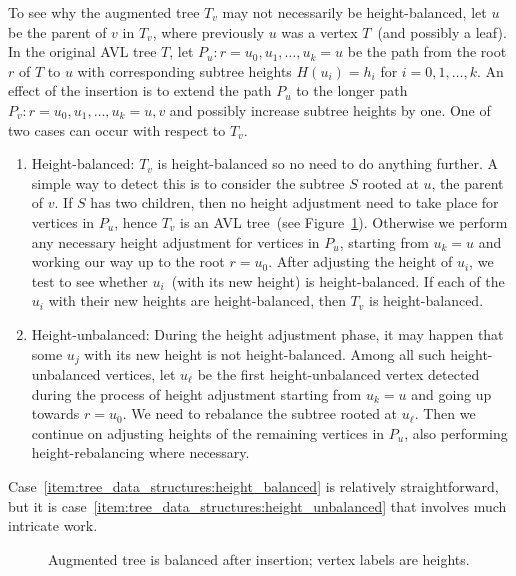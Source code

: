 To see why the augmented tree $T_v$ may not necessarily be
height-balanced, let $u$ be the parent of $v$ in $T_v$, where
previously $u$ was a vertex $T$~(and possibly a leaf). In the original
AVL tree $T$, let $P_u: r = u_0, u_1, \dots, u_k = u$ be the path from
the root $r$ of $T$ to $u$ with corresponding subtree heights $H(u_i)
= h_i$ for $i = 0, 1, \dots, k$. An effect of the insertion is to
extend the path $P_u$ to the longer path
$P_v: r = u_0, u_1, \dots, u_k = u, v$ and possibly increase subtree
heights by one. One of two cases can occur with respect to $T_v$.
\begin{enumerate}
\item\label{item:tree_data_structures:height_balanced}
  Height-balanced: $T_v$ is height-balanced so no need to do anything
  further. A simple way to detect this is to consider the subtree $S$
  rooted at $u$, the parent of $v$. If $S$ has two children, then no
  height adjustment need to take place for vertices in $P_u$, hence
  $T_v$ is an AVL tree~(see
  Figure~\ref{fig:tree_data_structures:augmented_tree_balanced_after_insertion}).
  Otherwise we perform any necessary height adjustment for vertices in
  $P_u$, starting from $u_k = u$ and working our way up to the root
  $r = u_0$. After adjusting the height of $u_i$, we test to see
  whether $u_i$~(with its new height) is height-balanced. If each of
  the $u_i$ with their new heights are height-balanced, then $T_v$ is
  height-balanced.

\item\label{item:tree_data_structures:height_unbalanced}
  Height-unbalanced: During the height adjustment phase, it may happen
  that some $u_j$ with its new height is not height-balanced. Among
  all such height-unbalanced vertices, let $u_\ell$ be the first
  height-unbalanced vertex detected during the process of height
  adjustment starting from $u_k = u$ and going up towards
  $r = u_0$. We need to rebalance the subtree rooted at $u_\ell$. Then
  we continue on adjusting heights of the remaining vertices in
  $P_u$, also performing height-rebalancing where necessary.
\end{enumerate}
Case~\ref{item:tree_data_structures:height_balanced} is relatively
straightforward, but it is
case~\ref{item:tree_data_structures:height_unbalanced} that involves
much intricate work.

\begin{figure}[!htbp]
\centering
{}

\caption{Augmented tree is balanced after insertion; vertex labels are
  heights.}
\label{fig:tree_data_structures:augmented_tree_balanced_after_insertion}
\end{figure}

